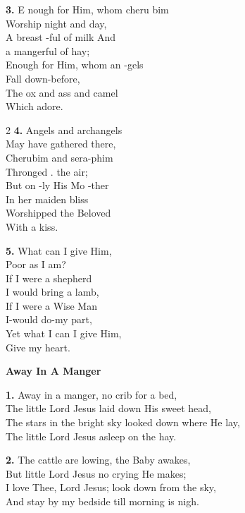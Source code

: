 \documentclass[a5paper,12pt]{article}
\begin{document}
\textbf{3.} E nough for Him, whom cheru bim\\
Worship night and day,\\
A breast -ful of milk And\\
a mangerful of hay;\\
Enough for Him, whom an -gels\\
Fall down-before,\\
The ox and ass and camel\\
Which adore.

\begin{multicols}{2}
\small
\textbf{4.} Angels and archangels\\
May have gathered there,\\
Cherubim and sera-phim\\
Thronged . the air;\\
But on -ly His Mo -ther\\
In her maiden bliss\\
Worshipped the Beloved\\
With a kiss.

\textbf{5.} What can I give Him,\\
Poor as I am?\\
If I were a shepherd\\
I would bring a lamb,\\
If I were a Wise Man\\
I-would do-my part,\\
Yet what I can I give Him,\\
Give my heart.

\end{multicols}
\newpage

\begin{center}{\Large\bfseries Away In A Manger}\end{center}
\vspace{0.3em}
\textbf{1.} Away in a manger, no crib for a bed,\\
The little Lord Jesus laid down His sweet head,\\
The stars in the bright sky looked down where He lay,\\
The little Lord Jesus asleep on the hay.

\textbf{2.} The cattle are lowing, the Baby awakes,\\
But little Lord Jesus no crying He makes;\\
I love Thee, Lord Jesus; look down from the sky,\\
And stay by my bedside till morning is nigh.
\end{document}
